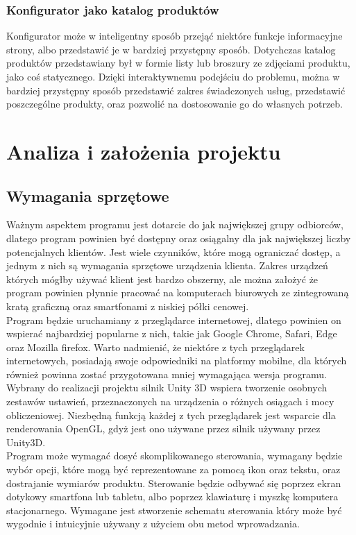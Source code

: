 \documentclass{article} %
\begin{document}
        \subsubsection{Konfigurator jako katalog produktów}
        Konfigurator może w inteligentny sposób przejąć niektóre funkcje informacyjne strony, albo przedstawić je w bardziej przystępny sposób. Dotychczas katalog produktów przedstawiany był w formie listy lub broszury ze zdjęciami produktu, jako coś statycznego. Dzięki interaktywnemu podejściu do problemu, można w bardziej przystępny sposób przedstawić zakres świadczonych usług, przedstawić poszczególne produkty, oraz pozwolić na dostosowanie go do własnych potrzeb.
        \\
        
\section{Analiza i założenia projektu}
    \subsection{Wymagania sprzętowe}
        Ważnym aspektem programu jest dotarcie do jak największej grupy odbiorców, dlatego program powinien być dostępny oraz osiągalny dla jak największej liczby potencjalnych klientów. Jest wiele czynników, które mogą ograniczać dostęp, a jednym z nich są wymagania sprzętowe urządzenia klienta. Zakres urządzeń których mógłby używać klient jest bardzo obszerny, ale można założyć że program powinien płynnie pracować na komputerach biurowych ze zintegrowaną kratą graficzną oraz smartfonami z niskiej półki cenowej.
        \\
        
        Program będzie uruchamiany z przeglądarce internetowej, dlatego powinien on wspierać najbardziej popularne z nich, takie jak Google Chrome, Safari, Edge oraz Mozilla firefox. Warto nadmienić, że niektóre z tych przeglądarek internetowych, posiadają swoje odpowiedniki na platformy mobilne, dla których również powinna zostać przygotowana mniej wymagająca wersja programu. Wybrany do realizacji projektu silnik Unity 3D wspiera tworzenie osobnych zestawów ustawień, przeznaczonych na urządzenia o różnych osiągach i mocy obliczeniowej. Niezbędną funkcją każdej z tych przeglądarek jest wsparcie dla renderowania OpenGL, gdyż jest ono używane przez silnik używany przez Unity3D.
        \\
        
        Program może wymagać dosyć skomplikowanego sterowania, wymagany będzie wybór opcji, które mogą być reprezentowane za pomocą ikon oraz tekstu, oraz dostrajanie wymiarów produktu. Sterowanie będzie odbywać się poprzez ekran dotykowy smartfona lub tabletu, albo poprzez klawiaturę i myszkę komputera stacjonarnego. Wymagane jest stworzenie schematu sterowania który może być wygodnie i intuicyjnie używany z użyciem obu metod wprowadzania.
        \\
        
\end{document}
